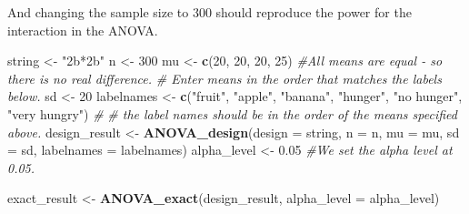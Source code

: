 \documentclass[]{book}
\newenvironment{Shaded}{\begin{snugshade}}{\end{snugshade}}
\newcommand{\CommentTok}[1]{\textcolor[rgb]{0.56,0.35,0.01}{\textit{#1}}}
\newcommand{\DataTypeTok}[1]{\textcolor[rgb]{0.13,0.29,0.53}{#1}}
\newcommand{\DecValTok}[1]{\textcolor[rgb]{0.00,0.00,0.81}{#1}}
\newcommand{\FloatTok}[1]{\textcolor[rgb]{0.00,0.00,0.81}{#1}}
\newcommand{\KeywordTok}[1]{\textcolor[rgb]{0.13,0.29,0.53}{\textbf{#1}}}
\newcommand{\NormalTok}[1]{#1}
\newcommand{\StringTok}[1]{\textcolor[rgb]{0.31,0.60,0.02}{#1}}
\begin{document}
And changing the sample size to 300 should reproduce the power for the interaction in the ANOVA.

\begin{Shaded}
\begin{Highlighting}[]
\NormalTok{string <-}\StringTok{ "2b*2b"}
\NormalTok{n <-}\StringTok{ }\DecValTok{300}
\NormalTok{mu <-}\StringTok{ }\KeywordTok{c}\NormalTok{(}\DecValTok{20}\NormalTok{, }\DecValTok{20}\NormalTok{, }\DecValTok{20}\NormalTok{, }\DecValTok{25}\NormalTok{) }\CommentTok{#All means are equal - so there is no real difference.}
\CommentTok{# Enter means in the order that matches the labels below.}
\NormalTok{sd <-}\StringTok{ }\DecValTok{20}
\NormalTok{labelnames <-}\StringTok{ }\KeywordTok{c}\NormalTok{(}\StringTok{"fruit"}\NormalTok{, }\StringTok{"apple"}\NormalTok{, }\StringTok{"banana"}\NormalTok{, }
                \StringTok{"hunger"}\NormalTok{, }\StringTok{"no hunger"}\NormalTok{, }\StringTok{"very hungry"}\NormalTok{) }\CommentTok{#}
\CommentTok{# the label names should be in the order of the means specified above.}
\NormalTok{design_result <-}\StringTok{ }\KeywordTok{ANOVA_design}\NormalTok{(}\DataTypeTok{design =}\NormalTok{ string,}
                   \DataTypeTok{n =}\NormalTok{ n, }
                   \DataTypeTok{mu =}\NormalTok{ mu, }
                   \DataTypeTok{sd =}\NormalTok{ sd, }
                   \DataTypeTok{labelnames =}\NormalTok{ labelnames)}
\NormalTok{alpha_level <-}\StringTok{ }\FloatTok{0.05} \CommentTok{#We set the alpha level at 0.05. }

\NormalTok{exact_result <-}\StringTok{ }\KeywordTok{ANOVA_exact}\NormalTok{(design_result, }\DataTypeTok{alpha_level =}\NormalTok{ alpha_level)}
\end{Highlighting}
\end{Shaded}
\end{document}
